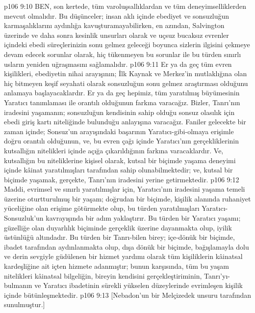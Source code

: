 \vs p106 9:10 BEN, son kertede, tüm varoluşsallıklardan  ve tüm deneyimselliklerden  mevcut olmalıdır. Bu düşünceler; insan aklı içinde ebediyet ve sonsuzluğun karmaşalıklarını aydınlığa kavuşturamayabilirken, en azından, Salvington üzerinde ve daha sonra kesinlik unsurları olarak ve uçsuz bucaksız evrenler içindeki ebedi süreçlerinizin sonu gelmez geleceği boyunca sizlerin ilgisini çekmeye devam edecek sorunlar olarak, hiç tükenmeyen bu sorunlar ile bu türden sınırlı usların yeniden uğraşmasını sağlamalıdır.
\vs p106 9:11 Er ya da geç tüm evren kişilikleri, ebediyetin nihai arayışının; İlk Kaynak ve Merkez’in mutlaklığına olan hiç bitmeyen keşif seyahati olarak sonsuzluğun sonu gelmez araştırması olduğunu anlamaya başlayacaklardır. Er ya da geç hepimiz, tüm yaratılmış büyümesinin Yaratıcı tanımlaması ile orantılı olduğunun farkına varacağız. Bizler, Tanrı’nın iradesini yaşamanın; sonsuzluğun kendisinin sahip olduğu sonsuz olasılık için ebedi giriş kartı niteliğinde bulunduğu anlayışına varacağız. Faniler gelecekte bir zaman içinde; Sonsuz’un arayışındaki başarının Yaratıcı\hyp{}gibi\hyp{}olmaya erişimle doğru orantılı olduğunun, ve, bu evren çağı içinde Yaratıcı’nın gerçekliklerinin kutsallığın nitelikleri içinde açığa çıkarıldığının farkına varacaklardır. Ve, kutsallığın bu niteliklerine kişisel olarak, kutsal bir biçimde yaşama deneyimi içinde kâinat yaratılmışları tarafından sahip olunabilmektedir; ve, kutsal bir biçimde yaşamak, gerçekte, Tanrı’nın iradesini yerine getirmektedir.
\vs p106 9:12 Maddi, evrimsel ve sınırlı yaratılmışlar için, Yaratıcı’nın iradesini yaşama temeli üzerine oturtturulmuş bir yaşam; doğrudan bir biçimde, kişilik alanında ruhaniyet yüceliğine olan erişime götürmekte olup, bu türden yaratılmışları Yaratıcı\hyp{}Sonsuzluk’un kavrayışında bir adım yaklaştırır. Bu türden bir Yaratıcı yaşamı; güzelliğe olan duyarlılık biçiminde gerçeklik üzerine dayanmakta olup, iyilik üstünlüğü altındadır. Bu türden bir Tanrı\hyp{}bilen birey; içe\hyp{}dönük bir biçimde, ibadet tarafından aydınlanmakta olup, dışa dönük bir biçimde, bağışlamayla dolu ve derin sevgiyle güdülenen bir hizmet yardımı olarak tüm kişiliklerin kâinatsal kardeşliğine ait içten hizmete adanmıştır; bunun karşısında, tüm bu yaşam nitelikleri kâinatsal bilgeliğin, bireyin kendisini gerçekleştiriminin, Tanrı’yı\hyp{}bulmanın ve Yaratıcı ibadetinin sürekli yükselen düzeylerinde evrimleşen kişilik içinde bütünleşmektedir.
\vs p106 9:13 [Nebadon’un bir Melçizedek unsuru tarafından sunulmuştur.]
